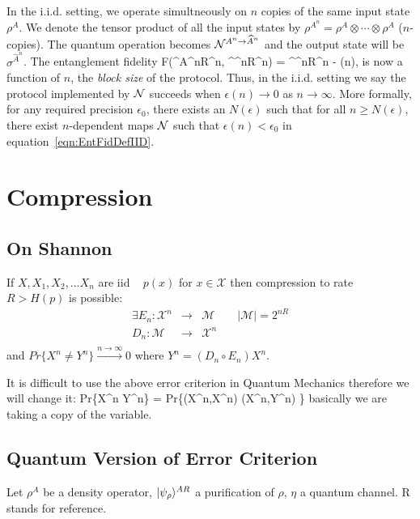 \documentclass[aps,11pt,twoside,letterpaper]{article}
\theoremstyle{plain}
\theoremstyle{definition}
\newcommand{\x}{  \ensuremath{\mathcal X} }
\newcommand{\m}{  \ensuremath{\mathcal M} }
\begin{document}
			In the i.i.d. setting, we operate simultneously on $n$ copies of the same input state $\rho^A$. 
			We denote the tensor product of all the input states by $\rho^{A^n} = \rho^A \otimes \cdots \otimes \rho^A$
			($n$-copies). The quantum operation becomes ${\cal N}^{A^n \to \widehat{A}^n}$ and the output state will be
			$\sigma^{\widehat{A}^n}$. 
			The entanglement fidelity 
			\be	\label{eqn:EntFidDefIID}
				F(\ket{\psi}^{A^nR^n}, \sigma^{^nR^n}) 
					= 		 \sigma^{^nR^n}  
					 - \epsilon(n),
			\ee	
			is now a function of $n$, the \emph{block size} of the protocol. 
			Thus, in the i.i.d. setting we say the protocol implemented by ${\cal N}$ succeeds when $\epsilon(n) \to 0$ as 
			$n \to \infty$. 
			More formally, for any required precision $\epsilon_0$, there exists an $N(\epsilon)$ such that for all 
			$n \geq N(\epsilon)$,  there exist $n$-dependent maps ${\cal N}$ such that $\epsilon(n) < \epsilon_0$ in 
			equation~\eqref{eqn:EntFidDefIID}.
			
			
			
			
			


\section{Compression}
\subsection{On Shannon} If $X,X_1,X_2,\ldots X_n$ are iid ~ $p(x)$ for $x\in \mathcal{X}$ then compression to rate $R>H(p)$ is possible:
\begin{eqnarray}
\exists E_n:\x^n 		& \rightarrow & 		\m \qquad |\m| = 2^{nR} \\
D_n:\m 			& \rightarrow &			\x^n \\
\end{eqnarray}
and $Pr\{X^n \neq Y^n\} \stackrel{n \to \infty}{\longrightarrow} 0$ where $Y^n = \left(D_n\circ E_n\right)X^n$.

It is difficult to use the above error criterion in Quantum Mechanics therefore we will change it:
\be
Pr\{X^n \neq Y^n\} = Pr\{(X^n,X^n) \neq (X^n,Y^n) \} 
\ee
basically we are taking a copy of the variable.




\subsection{Quantum Version of Error Criterion}
Let $\rho^A$ be a density operator, $| \psi_\rho \rangle^{AR}$ a purification of $\rho$, $\eta$ a quantum channel. R stands for reference.
\end{document}
